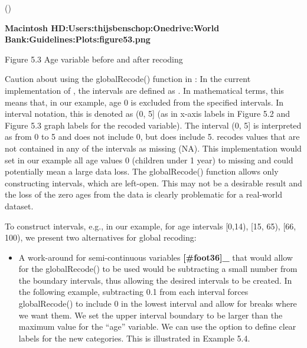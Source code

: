 \documentclass[letterpaper,10pt,english]{sphinxmanual}
\begin{document}
()

\begin{DUlineblock}{0em}
\item[] \sphinxcode{\sphinxupquote{\#\#    (0,5{]}   (5,11{]}  (11,17{]}  (17,21{]}  (21,25{]}  (25,49{]}  (49,65{]} (65,100{]}}}
\item[] 
\end{DUlineblock}

{\color{red}\bfseries{}\textbar{}Macintosh HD:Users:thijsbenschop:Onedrive:World
Bank:Guidelines:Plots:figure53.png\textbar{}}

Figure 5.3 Age variable before and after recoding

Caution about using the globalRecode() function in : In the
current implementation of , the intervals are defined as
. In mathematical terms, this means that, in our example,
age 0 is excluded from the specified intervals. In interval notation,
this is denoted as (0, 5{]} (as in x-axis labels in Figure 5.2 and Figure
5.3 graph labels for the recoded variable). The interval (0, 5{]} is
interpreted as from 0 to 5 and does not include 0, but does include 5.
 recodes values that are not contained in any of the intervals as
missing (NA). This implementation would set in our example all age
values 0 (children under 1 year) to missing and could potentially mean a
large data loss. The globalRecode() function allows only constructing
intervals, which are left-open. This may not be a desirable result and
the loss of the zero ages from the data is clearly problematic for a
real-world dataset.

To construct  intervals, e.g., in our example, for age
intervals {[}0,14), {[}15, 65), {[}66, 100), we present two alternatives for
global recoding:
\begin{itemize}
\item {} 
A work-around for semi-continuous variables {\color{red}\bfseries{}{[}\#foot36{]}\_}
that would allow for the globalRecode() to be used would be
subtracting a small number from the boundary intervals, thus allowing
the desired intervals to be created. In the following example,
subtracting 0.1 from each interval forces globalRecode() to include 0
in the lowest interval and allow for breaks where we want them. We
set the upper interval boundary to be larger than the maximum value
for the “age” variable. We can use the option  to define
clear labels for the new categories. This is illustrated in Example
5.4.

\end{itemize}
\end{document}
